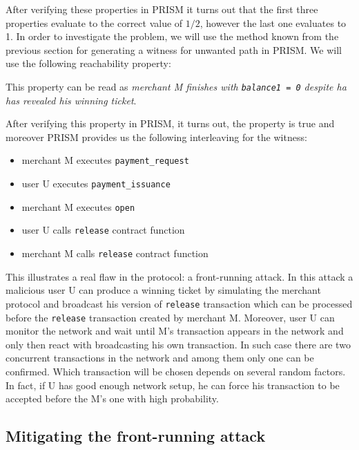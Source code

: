 After verifying these properties in PRISM it turns out that the first three properties 
evaluate to the correct value of $1/2$, however the last one evaluates to 1.
In order to investigate the problem, we will use the method known from the previous section for generating
a witness for unwanted path in PRISM.
We will use the following reachability property:

This property can be read as \emph{merchant M finishes with \lstinline{balance1 = 0} despite ha has revealed
his winning ticket}.

After verifying this property in PRISM, it turns out, the property is true and moreover PRISM provides us the 
following interleaving for the witness:
\begin{itemize}
\item merchant M executes \lstinline{payment_request}
\item user U executes \lstinline{payment_issuance}
\item merchant M executes \lstinline{open}
\item user U calls \lstinline{release} contract function
\item merchant M calls \lstinline{release} contract function
\end{itemize}
This illustrates a real flaw in the protocol: a front-running attack.
In this attack a malicious user U can produce a winning ticket by simulating
the merchant protocol and broadcast his version of \lstinline{release} transaction which can be processed 
before the \lstinline{release} transaction created by merchant M.
Moreover, user U can monitor the network and wait until M's transaction appears in the network and only then
react with broadcasting his own transaction.
In such case there are two concurrent transactions in the network and among them only one can be confirmed.
Which transaction will be chosen depends on several random factors.
In fact, if U has good enough network setup, he can force his transaction to be accepted before the M's one
with high probability.

\subsection{Mitigating the front-running attack}


